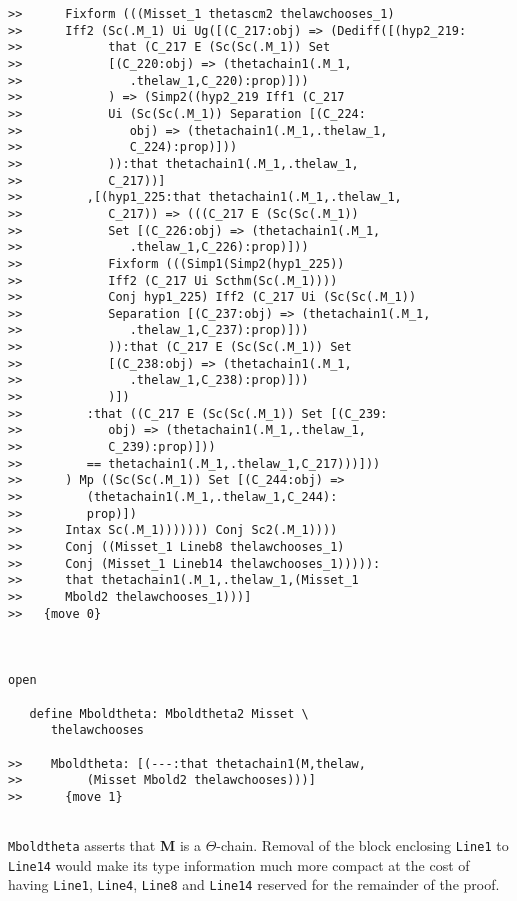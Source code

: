 \documentclass[12pt]{article}
\begin{document}
\begin{verbatim}
>>      Fixform (((Misset_1 thetascm2 thelawchooses_1)
>>      Iff2 (Sc(.M_1) Ui Ug([(C_217:obj) => (Dediff([(hyp2_219:
>>            that (C_217 E (Sc(Sc(.M_1)) Set
>>            [(C_220:obj) => (thetachain1(.M_1,
>>               .thelaw_1,C_220):prop)]))
>>            ) => (Simp2((hyp2_219 Iff1 (C_217
>>            Ui (Sc(Sc(.M_1)) Separation [(C_224:
>>               obj) => (thetachain1(.M_1,.thelaw_1,
>>               C_224):prop)]))
>>            )):that thetachain1(.M_1,.thelaw_1,
>>            C_217))]
>>         ,[(hyp1_225:that thetachain1(.M_1,.thelaw_1,
>>            C_217)) => (((C_217 E (Sc(Sc(.M_1))
>>            Set [(C_226:obj) => (thetachain1(.M_1,
>>               .thelaw_1,C_226):prop)]))
>>            Fixform (((Simp1(Simp2(hyp1_225))
>>            Iff2 (C_217 Ui Scthm(Sc(.M_1))))
>>            Conj hyp1_225) Iff2 (C_217 Ui (Sc(Sc(.M_1))
>>            Separation [(C_237:obj) => (thetachain1(.M_1,
>>               .thelaw_1,C_237):prop)]))
>>            )):that (C_217 E (Sc(Sc(.M_1)) Set
>>            [(C_238:obj) => (thetachain1(.M_1,
>>               .thelaw_1,C_238):prop)]))
>>            )])
>>         :that ((C_217 E (Sc(Sc(.M_1)) Set [(C_239:
>>            obj) => (thetachain1(.M_1,.thelaw_1,
>>            C_239):prop)]))
>>         == thetachain1(.M_1,.thelaw_1,C_217)))]))
>>      ) Mp ((Sc(Sc(.M_1)) Set [(C_244:obj) =>
>>         (thetachain1(.M_1,.thelaw_1,C_244):
>>         prop)])
>>      Intax Sc(.M_1))))))) Conj Sc2(.M_1))))
>>      Conj ((Misset_1 Lineb8 thelawchooses_1)
>>      Conj (Misset_1 Lineb14 thelawchooses_1))))):
>>      that thetachain1(.M_1,.thelaw_1,(Misset_1
>>      Mbold2 thelawchooses_1)))]
>>   {move 0}



open

   define Mboldtheta: Mboldtheta2 Misset \
      thelawchooses

>>    Mboldtheta: [(---:that thetachain1(M,thelaw,
>>         (Misset Mbold2 thelawchooses)))]
>>      {move 1}


\end{verbatim}

{\tt Mboldtheta} asserts that {\bf M} is a $\Theta$-chain.  Removal of the block enclosing {\tt Line1} to {\tt Line14} would make its type information much more compact at the  cost
of having {\tt Line1}, {\tt Line4}, {\tt Line8} and {\tt Line14} reserved for the remainder of the proof.
\end{document}
